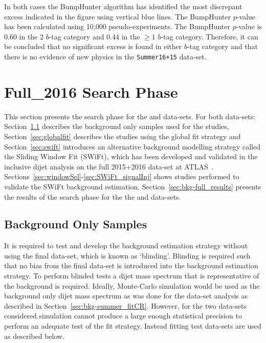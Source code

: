 In both cases the BumpHunter algorithm has identified the most discrepant excess indicated
in the figure using vertical blue lines.
The BumpHunter \mbox{$p$-value} has been calculated using 10,000 pseudo-experiments.
The BumpHunter \mbox{$p$-value} is 0.60 in the 2 $b$-tag category
and 0.44 in the $\geq1$ $b$-tag category.
Therefore, it can be concluded that no significant excess is found in either $b$-tag category
and that there is no evidence of new physics in the \verb|Summer16+15| data-set.

\section{Full\_2016 Search Phase}
\label{sec:bkg-full}

This section presents the search phase for the \hm{} and \lm{} data-sets.
For both data-sets:
Section~\ref{sec:stat:bkgsample} describes the background only samples used for the studies,
Section~\ref{sec:globalfit} describes the studies using the global fit strategy and
Section~\ref{sec:swift} introduces an alternative background modelling strategy called the Sliding Window Fit (SWiFt),
which has been developed and validated in the inclusive dijet analysis on the full 2015+2016 data-set at ATLAS~\cite{dijet_mori17_paper}.
Sections~\ref{sec:windowSel}-\ref{sec:SWiFt_signalInj} shows studies performed to validate the SWiFt background estimation.
Section~\ref{sec:bkg-full_results} presents the results of the search phase
for the the \hm{} and \lm{} data-sets.

\subsection{Background Only Samples}
\label{sec:stat:bkgsample}

It is required to test and develop the background estimation strategy without using the final data-set, which is known as `blinding'.
Blinding is required such that no bias from the final data-set is introduced into the background estimation strategy.
To perform blinded tests a dijet mass spectrum that is representative of the background is required.
Ideally, Monte-Carlo simulation would be used as the background only dijet mass spectrum
as was done for the \summer{} data-set analysis as described in Section~\ref{sec:bkg-summer_fitCR}.
However, for the two data-sets considered simulation cannot produce a large enough statistical precision to perform an adequate test of the fit strategy.
Instead fitting test data-sets are used as described below.

